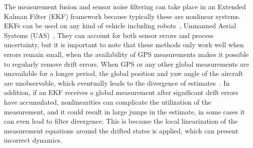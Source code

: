 The measurement fusion and sensor noise filtering can take place in an Extended Kalman Filter (EKF) framework because typically these are nonlinear systems. EKFs can be used on any kind of vehicle including robots~\cite{EKF-Robot}, Unmanned Aerial Systems (UAS)~\cite{EKF-UAS-1, EKF-UAS-2}, \etc{} They can account for both sensor errors and process uncertainty, but it is important to note that these methods only work well when errors remain small, \eg{} when the availability of GPS measurements makes it possible to regularly remove drift errors. When GPS or any other global measurements are unavailable for a longer period, the global position and yaw angle of the aircraft are unobservable, which eventually leads to the divergence of estimates~\cite{unobservable-1, unobservable-2}. In addition, if an EKF receives a global measurement after significant drift errors have accumulated, nonlinearities can complicate the utilization of the measurement, and it could result in large jumps in the estimate, in some cases it can even lead to filter divergence. This is because the local linearization of the measurement equations around the drifted states is applied, which can present incorrect dynamics.

